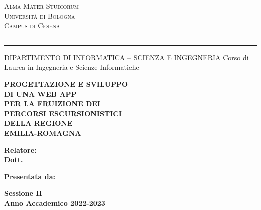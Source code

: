 
\oddsidemargin=25pt

\begin{titlepage}
\begin{center}
{{\Large{\textsc{Alma Mater Studiorum}}}\\
{\Large{\textsc{Universit\`a di Bologna}}} \\
{\textsc{Campus di Cesena}} \rule[0.1cm]{14cm}{0.1mm}
		\rule[0.5cm]{14cm}{0.6mm}
DIPARTIMENTO DI INFORMATICA – SCIENZA E INGEGNERIA
Corso di Laurea in Ingegneria e Scienze Informatiche }
\end{center}
\vspace{15mm}
\begin{center}
{\LARGE{\bf PROGETTAZIONE E SVILUPPO}}\\
\vspace{3mm}
{\LARGE{\bf DI UNA WEB APP}}\\
\vspace{3mm}
{\LARGE{\bf PER LA FRUIZIONE DEI}}\\
\vspace{3mm}
{\LARGE{\bf PERCORSI ESCURSIONISTICI}}\\
\vspace{3mm}
{\LARGE{\bf DELLA REGIONE}}\\
\vspace{3mm}
{\LARGE{\bf EMILIA-ROMAGNA}}\\
 
\end{center}
\vspace{40mm}
\par
\noindent
\begin{minipage}[t]{0.47\textwidth}
{\large{\bf Relatore:\\
Dott. \xsupervisor}}
\vspace{5mm}
\end{minipage}
\hfill
\begin{minipage}[t]{0.47\textwidth}\raggedleft
{\large{\bf Presentata da:\\
\xstudent}}
\end{minipage}
\vspace{15mm}
\begin{center}
{\large{\bf Sessione II\\%
Anno Accademico 2022-2023}}%
\end{center}

\clearpage{\pagestyle{empty}\cleardoublepage}%
\end{titlepage}




